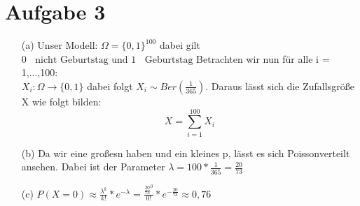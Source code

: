 \documentclass[10pt,a4paper]{article}
\newcommand{\ent}{\mathop{\widehat{=}}}
\begin{document}
\section*{Aufgabe 3}
\begin{itemize}
\item[(a)]Unser Modell: $\Omega = \{0,1\}^{100}$ dabei gilt $0 \ent \text{ nicht Geburtstag und } 1 \ent \text{ Geburtstag}$ Betrachten wir nun für alle i = 1,...,100:\\
$X_i: \Omega \rightarrow \{0,1\}$ dabei folgt $X_i \sim Ber(\frac{1}{365})$.
Daraus lässt sich die Zufallsgröße X wie folgt bilden: 
\[X = \sum_{i=1}^{100} X_i \]
\item[(b)]Da wir eine \grqq großes\grqq \text{ }n haben und ein \grqq kleines\grqq \text { } p, lässt es sich Poissonverteilt ansehen. Dabei ist der Parameter 
$\lambda = 100*\frac{1}{365} = \frac{20}{73} $
\item[(c)] $P(X=0) \approx \frac{\lambda^k}{k!}*e^{-\lambda} = \frac{\frac{20}{73}^0}{0!} *e^{-\frac{20}{73}} \approx 0,76$
\end{itemize}
\end{document}
